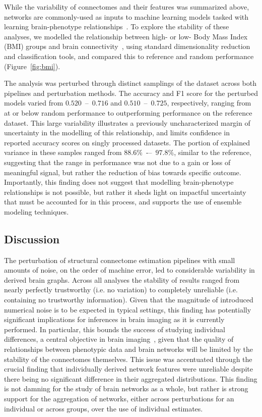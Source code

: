 \documentclass[fleqn,10pt]{SelfArx} %
\begin{document}
While the variability of connectomes and their features was summarized above, networks are commonly-used as inputs to
machine learning models tasked with learning brain-phenotype relationships~\cite{Dubois2016-yr}. To explore the
stability of these analyses, we modelled the relationship between high- or low- Body Mass Index (BMI) groups and brain
connectivity~\cite{Park2015-uj,Gupta2015-ap}, using standard dimensionality reduction and classification tools, and
compared this to reference and random performance (Figure~\ref{fig:bmi}).

The analysis was perturbed through distinct samplings of the dataset across both pipelines and perturbation methods.
The accuracy and F1 score for the perturbed models varied from $0.520$~–~$0.716$ and $0.510$~–~$0.725$, respectively,
ranging from at or below random performance to outperforming performance on the reference dataset. This large
variability illustrates a previously uncharacterized margin of uncertainty in the modelling of this relationship, and
limits confidence in reported accuracy scores on singly processed datasets. The portion of explained variance in these
samples ranged from $88.6\%$~-–~$97.8\%$, similar to the reference, suggesting that the range in performance was not
due to a gain or loss of meaningful signal, but rather the reduction of bias towards specific outcome. Importantly,
this finding does not suggest that modelling brain-phenotype relationships is not possible, but rather it sheds light
on impactful uncertainty that must be accounted for in this process, and supports the use of ensemble modeling
techniques.

\subsection*{Discussion}

The perturbation of structural connectome estimation pipelines with small amounts of noise, on the order of machine
error, led to considerable variability in derived brain graphs. Across all analyses the stability of results ranged
from nearly perfectly trustworthy (i.e. no variation) to completely unreliable (i.e. containing no trustworthy
information). Given that the magnitude of introduced numerical noise is to be expected in typical settings, this
finding has potentially significant implications for inferences in brain imaging as it is currently performed. In
particular, this bounds the success of studying individual differences, a central objective in brain
imaging~\cite{Dubois2016-yr}, given that the quality of relationships between phenotypic data and brain networks will
be limited by the stability of the connectomes themselves. This issue was accentuated through the crucial finding that
individually derived network features were unreliable despite there being no significant difference in their aggregated
distributions. This finding is not damning for the study of brain networks as a whole, but rather is strong support for
the aggregation of networks, either across perturbations for an individual or across groups, over the use of individual
estimates.
\end{document}
